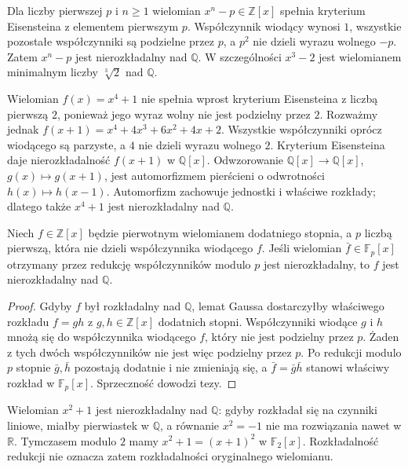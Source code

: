 \begin{przyklad}[Wielomiany $x^n-p$]
\label{aa:prz:xn-p}
Dla liczby pierwszej $p$ i $n\ge1$ wielomian
$x^n-p\in\mathbb Z[x]$ spełnia kryterium Eisensteina
z elementem pierwszym $p$. Współczynnik wiodący
wynosi $1$, wszystkie pozostałe współczynniki
są podzielne przez $p$, a $p^2$ nie dzieli wyrazu
wolnego $-p$. Zatem $x^n-p$ jest nierozkładalny
nad $\mathbb Q$. W szczególności $x^3-2$ jest
wielomianem minimalnym liczby $\sqrt[3]{2}$ nad $\mathbb Q$.
\end{przyklad}

\begin{przyklad}
\label{aa:prz:x4plus1}
Wielomian $f(x)=x^4+1$ nie spełnia wprost kryterium
Eisensteina z liczbą pierwszą $2$, ponieważ jego
wyraz wolny nie jest podzielny przez $2$. Rozważmy jednak
$f(x+1)=x^4+4x^3+6x^2+4x+2$.
Wszystkie współczynniki oprócz wiodącego są parzyste,
a $4$ nie dzieli wyrazu wolnego $2$.
Kryterium Eisensteina daje nierozkładalność $f(x+1)$
w $\mathbb Q[x]$. Odwzorowanie
$\mathbb Q[x]\to\mathbb Q[x]$, $g(x)\mapsto g(x+1)$,
jest automorfizmem pierścieni o odwrotności
$h(x)\mapsto h(x-1)$. Automorfizm zachowuje jednostki
i właściwe rozkłady; dlatego także $x^4+1$ jest
nierozkładalny nad $\mathbb Q$.
\end{przyklad}

\begin{twierdzenie}
\label{aa:tw:modp-irred}
Niech $f\in\mathbb Z[x]$ będzie pierwotnym wielomianem
dodatniego stopnia, a $p$ liczbą pierwszą, która nie
dzieli współczynnika wiodącego $f$. Jeśli wielomian
$\bar f\in\mathbb F_p[x]$ otrzymany przez redukcję
współczynników modulo $p$ jest nierozkładalny, to
$f$ jest nierozkładalny nad $\mathbb Q$.
\end{twierdzenie}
\begin{proof}
Gdyby $f$ był rozkładalny nad $\mathbb Q$, lemat
Gaussa dostarczyłby właściwego rozkładu
$f=gh$ z $g,h\in\mathbb Z[x]$ dodatnich stopni.
Współczynniki wiodące $g$ i $h$ mnożą się do
współczynnika wiodącego $f$, który nie jest podzielny
przez $p$. Żaden z tych dwóch współczynników nie jest
więc podzielny przez $p$. Po redukcji modulo $p$
stopnie $\bar g,\bar h$ pozostają dodatnie i nie zmieniają
się, a $\bar f=\bar g\bar h$ stanowi właściwy rozkład
w $\mathbb F_p[x]$. Sprzeczność dowodzi tezy.
\end{proof}

\begin{przyklad}
\label{aa:prz:modp-not-necessary}
Wielomian $x^2+1$ jest nierozkładalny nad $\mathbb Q$:
gdyby rozkładał się na czynniki liniowe, miałby pierwiastek
w $\mathbb Q$, a równanie $x^2=-1$ nie ma rozwiązania
nawet w $\mathbb R$. Tymczasem modulo $2$ mamy
$x^2+1=(x+1)^2$ w $\mathbb F_2[x]$.
Rozkładalność redukcji nie oznacza zatem
rozkładalności oryginalnego wielomianu.
\end{przyklad}

